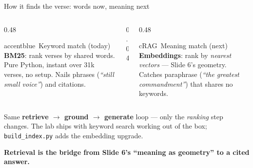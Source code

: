 \begin{frame}{How it finds the verse: words now, meaning next}
  \begin{columns}[t, totalwidth=\textwidth]
    \begin{column}{0.48\textwidth}
      \begin{featbox}{accentblue}{\faSearch\ Keyword match (today)}
        \scriptsize \textbf{BM25}: rank verses by shared words. Pure Python, instant
        over 31k verses, no setup. Nails phrases (\emph{``still small voice''}) and
        citations.
      \end{featbox}
    \end{column}
    \begin{column}{0.04\textwidth}\end{column}
    \begin{column}{0.48\textwidth}
      \begin{featbox}{cRAG}{\faVectorSquare\ Meaning match (next)}
        \scriptsize \textbf{Embeddings}: rank by \emph{nearest vectors} --- Slide 6's
        geometry. Catches paraphrase (\emph{``the greatest commandment''}) that shares
        no keywords.
      \end{featbox}
    \end{column}
  \end{columns}
  \vspace{8pt}
  \begin{center}
  \begin{minipage}{0.9\textwidth}\small
    Same \textbf{retrieve $\to$ ground $\to$ generate} loop --- only the \emph{ranking}
    step changes. The lab ships with keyword search working out of the box;
    \texttt{build\_index.py} adds the embedding upgrade.
  \end{minipage}
  \end{center}
  \vspace{4pt}
  \begin{center}\small\color{labnavy}\bfseries%
    Retrieval is the bridge from Slide 6's ``meaning as geometry'' to a cited answer.\end{center}
\end{frame}

